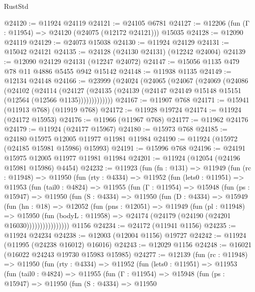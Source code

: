 \begin{lexlean}{RustStd}
\begin{coremodule}
@24120 := @11924 @24119
@24121 := @24105 @6781
@24127 := @12206 (fun (Γ : @11954) => @24120 (@24075 (@12172 @24121))) @15035
@24128 := @12090 @24119
@24129 := @24073 @15038
@24130 := @11924 @24129
@24131 := @15042 @24121
@24135 := @24128 (@24130 @24131) (@12242 @24004)
@24139 := @12090 @24129 @24131 (@12247 @24072)
@24147 := @15056 @1135 @479 @78 @11 @4886 @5455 @942 @15142
@24148 := @11938 @1135
@24149 := @12134 @24148
@24166 := @23999
    (@24024
      (@24065
        (@24067
          (@24069
            (@24086
              (@24102
                (@24114
                  (@24127
                    (@24135 (@24139 (@24147 @24149 @15148 @15151 (@12564 (@12566 @1135)))))))))))))
@24167 := @11907 @768
@24171 := @15941 (@11913 @768) (@11919 @768)
@24172 := @11928 @19724
@24174 := @11924 (@24172 @15953)
@24176 := @11966 (@11967 @768)
@24177 := @11962 @24176
@24179 := @11924 (@24177 @15967)
@24180 := @15973 @768
@24185 := @24180 @15975 @12005 @11977 @11981 @11984
@24190 := @11924 (@15972 (@24185 @15981 @15986) @15993)
@24191 := @15996 @768
@24196 := @24191 @15975 @12005 @11977 @11981 @11984
@24201 := @11924 (@12054 (@24196 @15981 @15986) @4454)
@24232 := @11923
    (fun (fn : @131) =>
    @11949
      (fun (rc : @11948) =>
      @11950
        (fun (rty : @4334) =>
        @11952
          (fun (lets0 : @11951) =>
          @11953
            (fun (tail0 : @4824) =>
            @11955
              (fun (Γ : @11954) =>
              @15948
                (fun (ps : @15947) =>
                @11950
                  (fun (S : @4334) =>
                  @11950
                    (fun (D : @4334) =>
                    @15949
                      (fun (hn : @18) =>
                      @12052
                        (fun (pns : @12051) =>
                        @11949
                          (fun (pl : @11948) =>
                          @15950
                            (fun (bodyL : @11958) =>
                            @24174 (@24179 (@24190 (@24201 @16030))))))))))))))))
    @1156
@24234 := @24172 (@11941 @1156)
@24235 := @11924 @24234
@24238 := @12003 (@12004 @1156) @19727
@24242 := @11924 (@11995 (@24238 @16012) @16016)
@24243 := @12029 @1156
@24248 := @16021 (@16022 @24243 @19730 @15983 @15985)
@24277 := @12139
    (fun (rc : @11948) =>
    @11950
      (fun (rty : @4334) =>
      @11952
        (fun (lets0 : @11951) =>
        @11953
          (fun (tail0 : @4824) =>
          @11955
            (fun (Γ : @11954) =>
            @15948
              (fun (ps : @15947) =>
              @11950
                (fun (S : @4334) =>
                @11950

\end{coremodule}
\end{lexlean}
